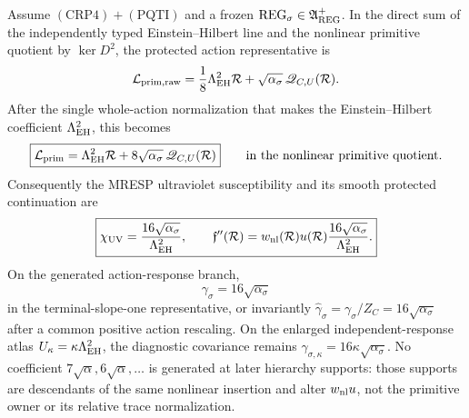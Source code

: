 \documentclass[12pt,a4paper]{article}
\begin{document}
\begin{theorem}
\label{p3e:thm:pqti-quadratic-normalization}
Assume \((\mathrm{CRP4})+(\mathrm{PQTI})\) and a frozen
\(\mathrm{REG}_\sigma\in\mathfrak A_{\rm REG}^{+}\).  In the direct sum of
the independently typed Einstein--Hilbert line and the nonlinear primitive
quotient by \(\ker D^2\), the protected action representative is
\[
 \mathcal L_{\rm prim,raw}
 =\frac18\Lambda_{\rm EH}^2\mathcal R
  +\sqrt{\alpha_\sigma}\,\mathscr Q_{C,U}(\mathcal R).
\]
After the single whole-action normalization that makes the
Einstein--Hilbert coefficient \(\Lambda_{\rm EH}^2\), this becomes
\begin{equation}
 \label{p3e:eq:pqti-eh-normalized-primitive-action}
 \boxed{\mathcal L_{\rm prim}
 =\Lambda_{\rm EH}^2\mathcal R
  +8\sqrt{\alpha_\sigma}\,\mathscr Q_{C,U}(\mathcal R)}
 \qquad\text{in the nonlinear primitive quotient.}
\end{equation}
Consequently the MRESP ultraviolet susceptibility and its smooth protected
continuation are
\begin{equation}
 \label{p3e:eq:pqti-smooth-hessian-law}
 \boxed{\chi_{\rm UV}
 =\frac{16\sqrt{\alpha_\sigma}}{\Lambda_{\rm EH}^2},\qquad
 \mathfrak f''(\mathcal R)
 =w_{\rm nl}(\mathcal R)u(\mathcal R)
  \frac{16\sqrt{\alpha_\sigma}}{\Lambda_{\rm EH}^2}.}
\end{equation}
On the generated action-response branch,
\[
 \boxed{\gamma_\sigma=16\sqrt{\alpha_\sigma}}
\]
in the terminal-slope-one representative, or invariantly
\(\widehat\gamma_\sigma=\gamma_\sigma/Z_C
=16\sqrt{\alpha_\sigma}\) after a common positive action rescaling.
On the enlarged independent-response atlas
\(U_\kappa=\kappa\Lambda_{\rm EH}^2\), the diagnostic covariance remains
\(\gamma_{\sigma,\kappa}=16\kappa\sqrt{\alpha_\sigma}\).
No coefficient \(7\sqrt\alpha,6\sqrt\alpha,\ldots\) is generated at later
hierarchy supports: those supports are descendants of the same nonlinear
insertion and alter \(w_{\rm nl}u\), not the primitive owner or its relative
trace normalization.
\end{theorem}
\end{document}
